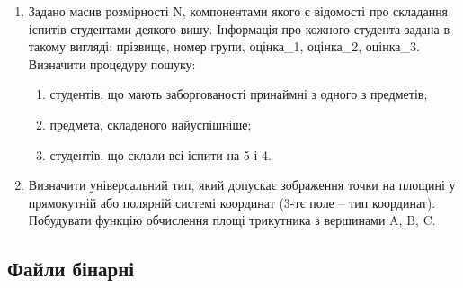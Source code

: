 \documentclass[]{article}
\makeatletter
\newcommand{\xslalph}[1]{\expandafter\@xslalph\csname c@#1\endcsname}
\newcommand{\@xslalph}[1]{%
    \ifcase#1\or а\or б\or в\or г\or д\or e\or є\or ж\or з\or i%
    \or й\or к\or л\or м\or н\or о\or п\or р\or с\or т%
    \or у\or ф\or х\or ц\or ч\or ш\or ю\or я\or аа\or бб\or вв %
    \else\@ctrerr\fi%
}
\makeatother
\begin{document}
\begin{enumerate}
\item
Задано масив розмірності N, компонентами якого є відомості про складання
іспитів студентами деякого вишу. Інформація про кожного студента задана
в такому вигляді: прізвище, номер групи, оцінка\_1, оцінка\_2,
оцінка\_3. Визначити процедуру пошуку:
\begin{enumerate}[label=\xslalph*)]
\item
студентів, що мають заборгованості принаймні з одного з предметів;
\item
 предмета, складеного найуспішніше;
\item
 студентів, що склали всі іспити на 5 і 4.
\end{enumerate}

\item
Визначити універсальний тип, який допускає зображення точки
на площині у прямокутній або полярній системі координат (3-тє поле --
тип координат). Побудувати функцію обчислення площі трикутника з
вершинами A, B, C.

\end{enumerate}

\subsection{Файли бінарні}
\end{document}
